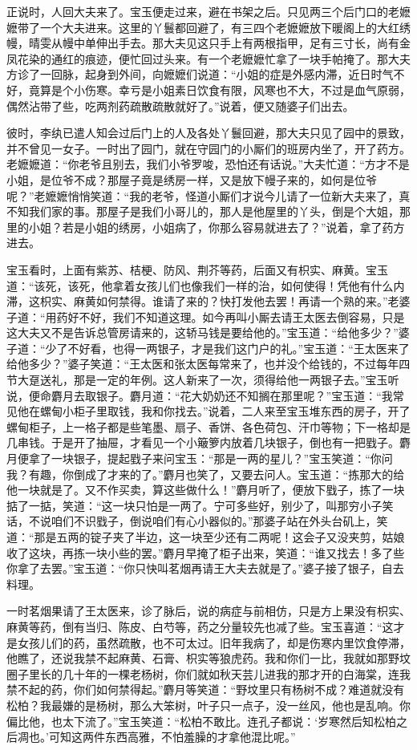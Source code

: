 正说时，人回大夫来了。宝玉便走过来，避在书架之后。只见两三个后门口的老嬷嬷带了一个大夫进来。这里的丫鬟都回避了，有三四个老嬷嬷放下暖阁上的大红绣幔，晴雯从幔中单伸出手去。那大夫见这只手上有两根指甲，足有三寸长，尚有金凤花染的通红的痕迹，便忙回过头来。有一个老嬷嬷忙拿了一块手帕掩了。那大夫方诊了一回脉，起身到外间，向嬷嬷们说道：“小姐的症是外感内滞，近日时气不好，竟算是个小伤寒。幸亏是小姐素日饮食有限，风寒也不大，不过是血气原弱，偶然沾带了些，吃两剂药疏散疏散就好了。”说着，便又随婆子们出去。

彼时，李纨已遣人知会过后门上的人及各处丫鬟回避，那大夫只见了园中的景致，并不曾见一女子。一时出了园门，就在守园门的小厮们的班房内坐了，开了药方。老嬷嬷道：“你老爷且别去，我们小爷罗唆，恐怕还有话说。”大夫忙道：“方才不是小姐，是位爷不成？那屋子竟是绣房一样，又是放下幔子来的，如何是位爷呢？”老嬷嬷悄悄笑道：“我的老爷，怪道小厮们才说今儿请了一位新大夫来了，真不知我们家的事。那屋子是我们小哥儿的，那人是他屋里的丫头，倒是个大姐，那里的小姐？若是小姐的绣房，小姐病了，你那么容易就进去了？”说着，拿了药方进去。

宝玉看时，上面有紫苏、桔梗、防风、荆芥等药，后面又有枳实、麻黄。宝玉道：“该死，该死，他拿着女孩儿们也像我们一样的治，如何使得！凭他有什么内滞，这枳实、麻黄如何禁得。谁请了来的？快打发他去罢！再请一个熟的来。”老婆子道：“用药好不好，我们不知道这理。如今再叫小厮去请王太医去倒容易，只是这大夫又不是告诉总管房请来的，这轿马钱是要给他的。”宝玉道：“给他多少？”婆子道：“少了不好看，也得一两银子，才是我们这门户的礼。”宝玉道：“王太医来了给他多少？”婆子笑道：“王太医和张太医每常来了，也并没个给钱的，不过每年四节大趸送礼，那是一定的年例。这人新来了一次，须得给他一两银子去。”宝玉听说，便命麝月去取银子。麝月道：“花大奶奶还不知搁在那里呢？”宝玉道：“我常见他在螺甸小柜子里取钱，我和你找去。”说着，二人来至宝玉堆东西的房子，开了螺甸柜子，上一格子都是些笔墨、扇子、香饼、各色荷包、汗巾等物；下一格却是几串钱。于是开了抽屉，才看见一个小簸箩内放着几块银子，倒也有一把戥子。麝月便拿了一块银子，提起戥子来问宝玉：“那是一两的星儿？”宝玉笑道：“你问我？有趣，你倒成了才来的了。”麝月也笑了，又要去问人。宝玉道：“拣那大的给他一块就是了。又不作买卖，算这些做什么！”麝月听了，便放下戥子，拣了一块掂了一掂，笑道：“这一块只怕是一两了。宁可多些好，别少了，叫那穷小子笑话，不说咱们不识戥子，倒说咱们有心小器似的。”那婆子站在外头台矶上，笑道：“那是五两的锭子夹了半边，这一块至少还有二两呢！这会子又没夹剪，姑娘收了这块，再拣一块小些的罢。”麝月早掩了柜子出来，笑道：“谁又找去！多了些你拿了去罢。”宝玉道：“你只快叫茗烟再请王大夫去就是了。”婆子接了银子，自去料理。

一时茗烟果请了王太医来，诊了脉后，说的病症与前相仿，只是方上果没有枳实、麻黄等药，倒有当归、陈皮、白芍等，药之分量较先也减了些。宝玉喜道：“这才是女孩儿们的药，虽然疏散，也不可太过。旧年我病了，却是伤寒内里饮食停滞，他瞧了，还说我禁不起麻黄、石膏、枳实等狼虎药。我和你们一比，我就如那野坟圈子里长的几十年的一棵老杨树，你们就如秋天芸儿进我的那才开的白海棠，连我禁不起的药，你们如何禁得起。”麝月等笑道：“野坟里只有杨树不成？难道就没有松柏？我最嫌的是杨树，那么大笨树，叶子只一点子，没一丝风，他也是乱响。你偏比他，也太下流了。”宝玉笑道：“松柏不敢比。连孔子都说：‘岁寒然后知松柏之后凋也。’可知这两件东西高雅，不怕羞臊的才拿他混比呢。”


